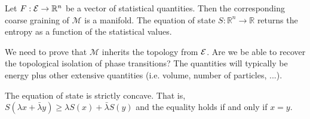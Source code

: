 \begin{conj}
	Let $F : \mathcal{E} \to \mathbb{R}^n$ be a vector of statistical quantities. Then the corresponding coarse graining of $\mathcal{M}$ is a manifold. The equation of state $S : \mathbb{R}^n \to \mathbb{R}$ returns the entropy as a function of the statistical values.
\end{conj}

\begin{remark}
	We need to prove that $\mathcal{M}$ inherits the topology from $\mathcal{E}$. Are we be able to recover the topological isolation of phase transitions? The quantities will typically be energy plus other extensive quantities (i.e. volume, number of particles, ...).
\end{remark}

\begin{prop}
	The equation of state is strictly concave. That is, $S(\lambda x + \bar{\lambda} y) \geq \lambda S(x) + \bar{\lambda} S(y)$ and the equality holds if and only if $x=y$.
\end{prop}

